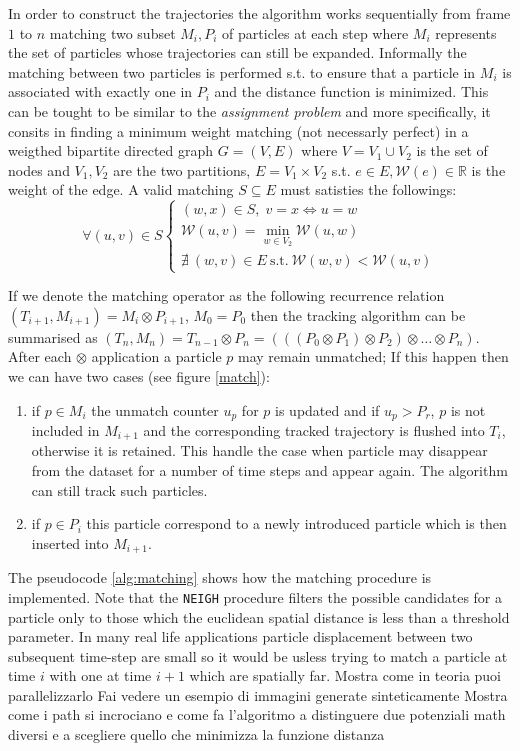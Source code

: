 \documentclass[conference]{IEEEtran}
\begin{document}
 
In order to construct the trajectories the algorithm works sequentially from frame $1$ to $n$ matching two subset $M_i,P_{i}$ of particles at each step where $M_i$ represents the set of particles whose trajectories can still be expanded. Informally the matching between two particles is performed s.t. to ensure that a particle in $M_i$ is associated with exactly one in $P_i$ and the distance function is minimized.
This can be tought to be similar to the \textit{assignment problem} \cite{bellmann1978} and more specifically, it consits in finding a minimum weight matching (not necessarly perfect) in  a weigthed bipartite directed graph $G=(V,E)$ where $V=V_1 \cup V_2$ is the set of nodes and $V_1,V_2$ are the two partitions, $E = V_1 \times V_2$ s.t. $e \in E, \mathcal{W}(e) \in \mathbb{R}$ is the weight of the edge. 
A valid matching $S \subseteq E$ must satisties the followings: 
\[ \forall (u,v) \in S 
\left\{
  \begin{array}{lr}
   (w,x) \in S,\; v=x\Longleftrightarrow u=w\\
   \mathcal{W}(u,v) = \min_{w \in V_2} \mathcal{W}(u,w)  \\
    \nexists \: (w,v) \in E \: \mbox{s.t.} \: \mathcal{W}(w,v) < \mathcal{W}(u,v)
  \end{array}
\right.
\]

If we denote the matching operator  as the following recurrence relation $(T_{i+1},M_{i+1}) = M_i \otimes P_{i+1} $, $M_0=P_0$ then the  tracking algorithm can be summarised as $(T_n,M_n) = T_{n-1} \otimes P_{n}=(((P_0 \otimes P_1)\otimes P_2) \otimes \ldots \otimes P_n)$.
After each $\otimes$ application a particle $p$ may remain  unmatched; If this happen then we can have two cases (see figure \ref{match}):
\begin{enumerate}
 \item if $p \in M_{i}$ the unmatch counter $u_p$ for $p$ is updated and if $u_p > P_r$, $p$ is not included in $M_{i+1}$ and the corresponding tracked trajectory is flushed into $T_i$, otherwise it is retained. This handle the case when particle may disappear from the dataset for a number of time steps and  appear again. The algorithm can still track such particles.
 \item if $p \in P_i$ this particle correspond to a newly introduced particle which is then inserted into $M_{i+1}$. 
\end{enumerate}
 
The pseudocode \ref{alg:matching} shows how the matching procedure is implemented. Note that the \texttt{NEIGH} procedure filters the possible candidates for a particle only to those which the euclidean spatial distance is less than a threshold parameter. In many real life applications particle displacement between two subsequent time-step are small so it would be usless trying to match a particle at time $i$ with one at time $i+1$ which are spatially far.
Mostra come in teoria puoi parallelizzarlo
Fai vedere un esempio di immagini generate sinteticamente
Mostra come i path si incrociano e come fa l'algoritmo a distinguere due potenziali math diversi e a scegliere quello che minimizza la funzione distanza
\end{document}
